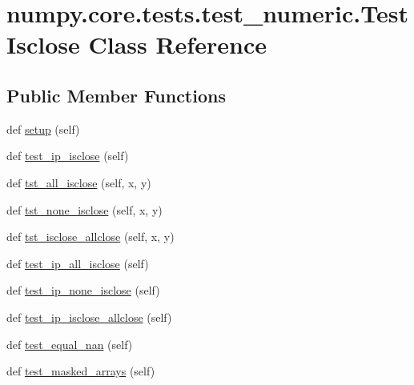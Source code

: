 \hypertarget{classnumpy_1_1core_1_1tests_1_1test__numeric_1_1TestIsclose}{}\section{numpy.\+core.\+tests.\+test\+\_\+numeric.\+Test\+Isclose Class Reference}
\label{classnumpy_1_1core_1_1tests_1_1test__numeric_1_1TestIsclose}
\subsection*{Public Member Functions}
\begin{DoxyCompactItemize}
\item 
def \hyperlink{classnumpy_1_1core_1_1tests_1_1test__numeric_1_1TestIsclose_aee978af4aabaf8477dac11e9093b1eee}{setup} (self)
\item 
def \hyperlink{classnumpy_1_1core_1_1tests_1_1test__numeric_1_1TestIsclose_afa9e95a35aad5950e4d1807768bfaf56}{test\+\_\+ip\+\_\+isclose} (self)
\item 
def \hyperlink{classnumpy_1_1core_1_1tests_1_1test__numeric_1_1TestIsclose_aff52f6053fdb630f23df74752c3f575f}{tst\+\_\+all\+\_\+isclose} (self, x, y)
\item 
def \hyperlink{classnumpy_1_1core_1_1tests_1_1test__numeric_1_1TestIsclose_a2bb5c69332d1e6881926f4827f608e1b}{tst\+\_\+none\+\_\+isclose} (self, x, y)
\item 
def \hyperlink{classnumpy_1_1core_1_1tests_1_1test__numeric_1_1TestIsclose_afc10b1b2f71bafa31fd8c48f586ed6af}{tst\+\_\+isclose\+\_\+allclose} (self, x, y)
\item 
def \hyperlink{classnumpy_1_1core_1_1tests_1_1test__numeric_1_1TestIsclose_aeb571f3a7026e8c6cb9fbbe06687f992}{test\+\_\+ip\+\_\+all\+\_\+isclose} (self)
\item 
def \hyperlink{classnumpy_1_1core_1_1tests_1_1test__numeric_1_1TestIsclose_adff599e885829aaa411f0c10af8ccee9}{test\+\_\+ip\+\_\+none\+\_\+isclose} (self)
\item 
def \hyperlink{classnumpy_1_1core_1_1tests_1_1test__numeric_1_1TestIsclose_ad15567ae4c73b0810fb2575aca0c25f3}{test\+\_\+ip\+\_\+isclose\+\_\+allclose} (self)
\item 
def \hyperlink{classnumpy_1_1core_1_1tests_1_1test__numeric_1_1TestIsclose_ae305011e9d94eadc386c3b26a034255c}{test\+\_\+equal\+\_\+nan} (self)
\item 
def \hyperlink{classnumpy_1_1core_1_1tests_1_1test__numeric_1_1TestIsclose_ae0f93af9324224a92223557d0bf4cec6}{test\+\_\+masked\+\_\+arrays} (self)

\end{DoxyCompactItemize}

